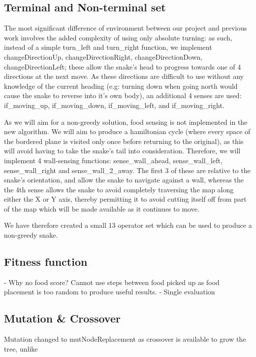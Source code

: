 \documentclass[british,10pt,a4paper]{article}
\begin{document}
\subsection{Terminal and Non-terminal set}
\label{subsec:design_terminals}
The most significant difference of environment between our project and previous work involves the added complexity of using only absolute turning: as such, instead of a simple turn\_left and turn\_right function, we implement changeDirectionUp, changeDirectionRight, changeDirectionDown, changeDirectionLeft; these allow the snake's head to progress towards one of 4 directions at the next move. As these directions are difficult to use without any knowledge of the current heading (e.g: turning down when going north would cause the snake to reverse into it's own body), an additional 4 senses are used: if\_moving\_up, if\_moving\_down, if\_moving\_left, and if\_moving\_right. \newline

As we will aim for a non-greedy solution, food sensing is not implemented in the new algorithm. We will aim to produce a hamiltonian cycle (where every space of the bordered plane is visited only once before returning to the original), as this will avoid having to take the snake's tail into consideration. Therefore, we will implement 4 wall-sensing functions: sense\_wall\_ahead, sense\_wall\_left, sense\_wall\_right and sense\_wall\_2\_away. The first 3 of these are relative to the snake's orientation, and allow the snake to navigate against a wall, whereas the the 4th sense allows the snake to avoid completely traversing the map along either the X or Y axis, thereby permitting it to avoid cutting itself off from part of the map which will be made available as it continues to move. \newline

We have therefore created a small 13 operator set which can be used to produce a non-greedy snake.
\subsection{Fitness function}
- Why no food score? \newline
Cannot use steps between food picked up as food placement is too random to produce useful results.
- Single evaluation 

\subsection{Mutation \& Crossover}
Mutation changed to mutNodeReplacement as crossover is available to grow the tree, unlike 
\end{document}
